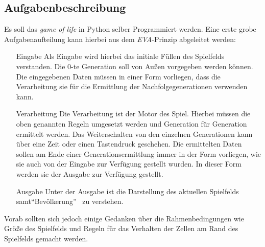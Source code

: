 \subsection{Aufgabenbeschreibung}
Es soll das \textit{game of life} in Python selber Programmiert werden. Eine erste grobe Aufgabenaufteilung kann hierbei aus dem \textit{EVA}-Prinzip abgeleitet werden:
\begin{itemize}
	\item[Eingabe] Als Eingabe wird hierbei das initiale Füllen des Spielfelds verstanden. Die 0-te Generation soll von Außen vorgegeben werden können. Die eingegebenen Daten müssen in einer Form vorliegen, dass die Verarbeitung sie für die Ermittlung der Nachfolgegenerationen verwenden kann.
	\item[Verarbeitung] Die Verarbeitung ist der Motor des Spiel. Hierbei müssen die oben genannten Regeln umgesetzt werden und Generation für Generation ermittelt werden. Das Weiterschalten von den einzelnen Generationen kann über eine Zeit oder einen Tastendruck geschehen. Die ermittelten Daten sollen am Ende einer Generationsermittlung immer in der Form vorliegen, wie sie auch von der Eingabe zur Verfügung gestellt wurden. In dieser Form werden sie der Ausgabe zur Verfügung gestellt.
	\item[Ausgabe] Unter der Ausgabe ist die Darstellung des aktuellen Spielfelds samt\textquotedblleft Bevölkerung\textquotedblright~ zu verstehen.
\end{itemize}

Vorab sollten sich jedoch einige Gedanken über die Rahmenbedingungen wie Größe des Spielfelds und Regeln für das Verhalten der Zellen am Rand des Spielfelds gemacht werden. 


